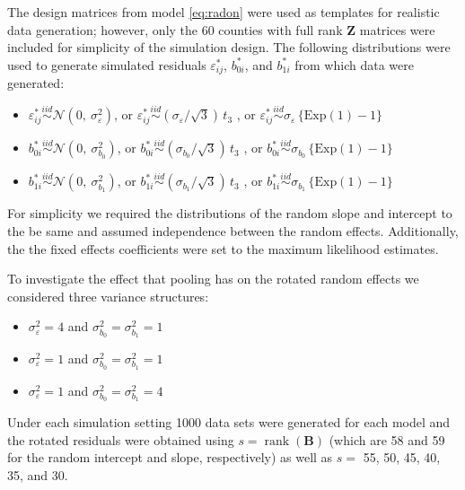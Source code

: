 \documentclass[12pt]{article} %
\DeclareMathOperator{\rank}{rank}
\begin{document}
The design matrices from model \eqref{eq:radon} were used as templates for realistic data generation; however, only the 60 counties with full rank $\bm{Z}$ matrices were included for simplicity of the simulation design.
The following distributions were used to generate simulated residuals $\varepsilon_{ij}^*$, $b_{0i}^*$, and $b_{1i}^*$ from which data were generated:
%
\begin{itemize}
\item $\varepsilon_{ij}^* \overset{iid}{\sim} \mathcal{N}(0, \ \sigma^2_{\varepsilon})$, or $\varepsilon_{ij}^* \overset{iid}{\sim} (\sigma_{\varepsilon} / \sqrt{3})\, t_3$ , or $\varepsilon_{ij}^* \overset{iid}{\sim} \sigma_{\varepsilon} \, \{ \text{Exp}(1) - 1 \}$

\item $b_{0i}^* \overset{iid}{\sim} \mathcal{N}(0, \ \sigma^2_{b_{0}})$, or $b_{0i}^* \overset{iid}{\sim} (\sigma_{b_{0}} / \sqrt{3})\, t_3$ , or $b_{0i}^* \overset{iid}{\sim} \sigma_{b_{0}} \, \{ \text{Exp}(1) - 1 \}$

\item $b_{1i}^* \overset{iid}{\sim} \mathcal{N}(0, \ \sigma^2_{b_{1}})$, or $b_{1i}^* \overset{iid}{\sim} (\sigma_{b_{1}} / \sqrt{3})\, t_3$ , or $b_{1i}^* \overset{iid}{\sim} \sigma_{b_{1}} \, \{ \text{Exp}(1) - 1 \}$
\end{itemize}
%
For simplicity we required the distributions of the random slope and intercept to the be same and assumed independence between the random effects. Additionally, the the fixed effects coefficients were set to the maximum likelihood estimates.

To investigate the effect that pooling has on the rotated random effects we considered  three variance structures:
%
\begin{itemize}
\item $\sigma^2_\varepsilon = 4$ and  $\sigma^2_{b_0} = \sigma^2_{b_1} = 1$
\item $\sigma^2_\varepsilon = 1$ and  $\sigma^2_{b_0} = \sigma^2_{b_1} = 1$
\item $\sigma^2_\varepsilon = 1$ and  $\sigma^2_{b_0} = \sigma^2_{b_1} = 4$

\end{itemize}
%

Under each simulation setting 1000 data sets were generated for each model and the rotated residuals were obtained using $s = \rank(\bm{B})$ (which are 58 and 59 for the random intercept and slope, respectively) as well as $s =$ 55, 50, 45, 40, 35, and 30.
\end{document}
